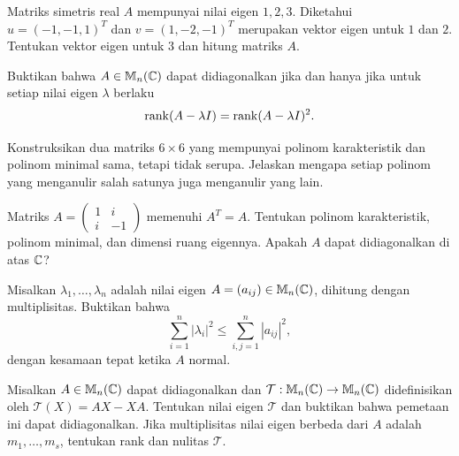 \begin{latihan}\label{eigen:lat-rekonstruksi}
    Matriks simetris real $A$ mempunyai nilai eigen $1,2,3$.
    Diketahui $u=(-1,-1,1)^T$ dan $v=(1,-2,-1)^T$ merupakan
    vektor eigen untuk $1$ dan $2$. Tentukan vektor eigen untuk $3$
    dan hitung matriks $A$.
\end{latihan}

\begin{latihan}\label{eigen:lat-rank-diagonal}
    Buktikan bahwa $A\in\mathbb{M}_n(\mathbb{C})$ dapat didiagonalkan jika dan
    hanya jika untuk setiap nilai eigen $\lambda$ berlaku
    \[
        \operatorname{rank}(A-\lambda I)=\operatorname{rank}(A-\lambda I)^2.
    \]
\end{latihan}

\begin{latihan}\label{eigen:lat-minimal-sama}
    Konstruksikan dua matriks $6\times6$ yang mempunyai polinom
    karakteristik dan polinom minimal sama, tetapi tidak serupa.
    Jelaskan mengapa setiap polinom yang menganulir salah satunya
    juga menganulir yang lain.
\end{latihan}

\begin{latihan}\label{eigen:lat-simetris-kompleks}
    Matriks $A=\begin{pmatrix}1&i\\i&-1\end{pmatrix}$ memenuhi $A^T=A$.
    Tentukan polinom karakteristik, polinom minimal, dan dimensi
    ruang eigennya. Apakah $A$ dapat didiagonalkan di atas $\mathbb{C}$?
\end{latihan}

\begin{latihan}\label{eigen:lat-frobenius}
    Misalkan $\lambda_1,\ldots,\lambda_n$ adalah nilai eigen
    $A=(a_{ij})\in\mathbb{M}_n(\mathbb{C})$, dihitung dengan multiplisitas.
    Buktikan bahwa
    \[
        \sum_{i=1}^n|\lambda_i|^2\le\sum_{i,j=1}^n|a_{ij}|^2,
    \]
    dengan kesamaan tepat ketika $A$ normal.
\end{latihan}

\begin{latihan}\label{eigen:lat-komutator}
    Misalkan $A\in\mathbb{M}_n(\mathbb{C})$ dapat didiagonalkan dan
    $\mathcal T:\mathbb{M}_n(\mathbb{C})\to\mathbb{M}_n(\mathbb{C})$ didefinisikan oleh
    $\mathcal T(X)=AX-XA$.
    Tentukan nilai eigen $\mathcal T$ dan buktikan bahwa pemetaan ini
    dapat didiagonalkan. Jika multiplisitas nilai eigen berbeda dari
    $A$ adalah $m_1,\ldots,m_s$, tentukan rank dan nulitas $\mathcal T$.
\end{latihan}

